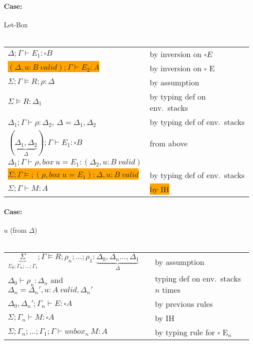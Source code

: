 \documentclass[12 pt]{article}
\begin{document}
      \paragraph{Case:} Let-Box
      \\ 
      \DP
      \\
      \begin{tabular}{l l}
        $\Delta; \Gamma \vdash E_1 : \square B$& by inversion on $\square E$
        \\ \colorbox{orange}{$(\Delta, u : B\ valid); \Gamma \vdash E_2 : A$} & by inversion on $\square$ E
        \\ $\Sigma; \Gamma \models R ; \rho : \Delta$ & by assumption
        \\ $\Sigma \models R : \Delta_1$ & by typing def on env.\ stacks
        \\ $\Delta_1 ; \Gamma \vdash \rho : \Delta_2$, $\Delta = \Delta_1, \Delta_2$ & by typing def of env.\ stacks
        \\ $(\underbrace{\Delta_1, \Delta_2}_{\Delta}) ; \Gamma \vdash E_1 : \square B$ & from above
        \\ $\Delta_1; \Gamma \vdash \rho, box\ u = E_1 : (\Delta_2, u:B\ valid)$
        \\ \colorbox{orange}{$\Sigma; \Gamma \models; (\rho, box\ u = E_1) : \Delta, u : B\ valid$} & by typing def of env.\ stacks
        \\ $\Sigma; \Gamma \vdash M : A$ & \colorbox{orange}{by IH}
      \end{tabular}
      \paragraph{Case:} $u$ (from $\Delta$)
      \\
      \DP
      \\
      \begin{tabular}{l l}
        $\underbrace{\Sigma}_{\Sigma_0; \Gamma_n; \ldots; \Gamma_1}; \Gamma \models R; \rho_n; \ldots; \rho_1 : \underbrace{\Delta_0, \Delta_n \ldots, \Delta_1}_{\Delta}$& by assumption
        \\ $\Delta_0 \vdash \rho_n : \Delta_n$ and $\Delta_n = \Delta_n', u : A\ valid, \Delta_n'$& typing def on env.\ stacks $n$ times
        \\ $\Delta_0, \Delta_n'; \Gamma_n \vdash E : \square A$ & by previous rules
        \\ $\Sigma; \Gamma_n \vdash M : \square A$ & by IH
        \\ $\Sigma; \Gamma_n ; \ldots; \Gamma_1; \Gamma \vdash unbox_n\ M : A$ & by typing rule for $\square$ E$_n$
      \end{tabular}
\end{document}
